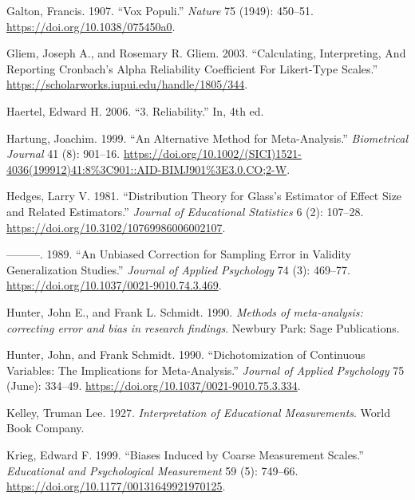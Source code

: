 \documentclass[
  letterpaper,
  DIV=11,
  numbers=noendperiod]{scrreprt}
\newlength{\cslhangindent}
\newlength{\cslentryspacingunit} %
\newenvironment{CSLReferences}[2] %
 {%
  \setlength{\parindent}{0pt}
  \ifodd #1
  \let\oldpar\par
  \def\par{\hangindent=\cslhangindent\oldpar}
  \fi
  \setlength{\parskip}{#2\cslentryspacingunit}
 }%
 {}
\begin{document}
\begin{CSLReferences}{1}{0}
\leavevmode{}%
Galton, Francis. 1907. {``Vox Populi.''} \emph{Nature} 75 (1949):
450--51. \url{https://doi.org/10.1038/075450a0}.

\leavevmode{}%
Gliem, Joseph A., and Rosemary R. Gliem. 2003. {``Calculating,
Interpreting, And Reporting Cronbach{'}s Alpha Reliability Coefficient
For Likert-Type Scales.''}
\url{https://scholarworks.iupui.edu/handle/1805/344}.

\leavevmode{}%
Haertel, Edward H. 2006. {``3. Reliability.''} In, 4th ed.

\leavevmode{}%
Hartung, Joachim. 1999. {``An Alternative Method for Meta-Analysis.''}
\emph{Biometrical Journal} 41 (8): 901--16.
\url{https://doi.org/10.1002/(SICI)1521-4036(199912)41:8\%3C901::AID-BIMJ901\%3E3.0.CO;2-W}.

\leavevmode{}%
Hedges, Larry V. 1981. {``Distribution Theory for Glass's Estimator of
Effect Size and Related Estimators.''} \emph{Journal of Educational
Statistics} 6 (2): 107--28.
\url{https://doi.org/10.3102/10769986006002107}.

\leavevmode{}%
---------. 1989. {``An Unbiased Correction for Sampling Error in
Validity Generalization Studies.''} \emph{Journal of Applied Psychology}
74 (3): 469--77. \url{https://doi.org/10.1037/0021-9010.74.3.469}.

\leavevmode{}%
Hunter, John E., and Frank L. Schmidt. 1990. \emph{Methods of
meta-analysis: correcting error and bias in research findings}. Newbury
Park: Sage Publications.

\leavevmode{}%
Hunter, John, and Frank Schmidt. 1990. {``Dichotomization of Continuous
Variables: The Implications for Meta-Analysis.''} \emph{Journal of
Applied Psychology} 75 (June): 334--49.
\url{https://doi.org/10.1037/0021-9010.75.3.334}.

\leavevmode{}%
Kelley, Truman Lee. 1927. \emph{Interpretation of Educational
Measurements}. World Book Company.

\leavevmode{}%
Krieg, Edward F. 1999. {``Biases Induced by Coarse Measurement
Scales.''} \emph{Educational and Psychological Measurement} 59 (5):
749--66. \url{https://doi.org/10.1177/00131649921970125}.


\end{CSLReferences}
\end{document}
